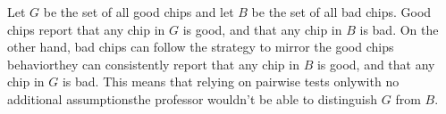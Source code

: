 Let $G$ be the set of all good chips and let $B$ be the set of all bad chips.
Good chips report that any chip in $G$ is good, and that any chip in $B$ is bad.
On the other hand, bad chips can follow the strategy to mirror the good chips behavior\dash they can consistently report that any chip in $B$ is good, and that any chip in $G$ is bad.
This means that relying on pairwise tests only\dash with no additional assumptions\dash the professor wouldn't be able to distinguish $G$ from $B$.

